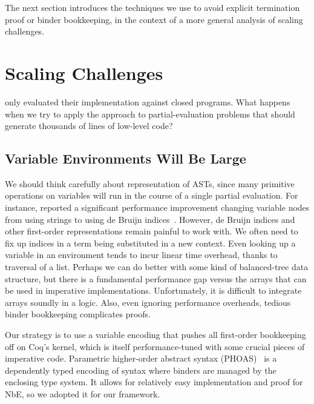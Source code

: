 The next section introduces the techniques we use to avoid explicit termination proof or binder bookkeeping, in the context of a more general analysis of scaling challenges.


\section{Scaling Challenges}\label{sec:scaling}

\textcite{Aehlig} only evaluated their implementation against closed programs.
What happens when we try to apply the approach to partial-evaluation problems that should generate thousands of lines of low-level code?

\subsection{Variable Environments Will Be Large}\label{sec:PHOAS}
We should think carefully about representation of ASTs, since many primitive operations on variables will run in the course of a single partial evaluation.
For instance, \textcite{Aehlig} reported a significant performance improvement changing variable nodes from using strings to using de Bruijn indices~\cite{debruijn1972}.
However, de Bruijn indices and other first-order representations remain painful to work with.
We often need to fix up indices in a term being substituted in a new context.
Even looking up a variable in an environment tends to incur linear time overhead, thanks to traversal of a list.
Perhaps we can do better with some kind of balanced-tree data structure, but there is a fundamental performance gap versus the arrays that can be used in imperative implementations.
Unfortunately, it is difficult to integrate arrays soundly in a logic.
Also, even ignoring performance overheads, tedious binder bookkeeping complicates proofs.

Our strategy is to use a variable encoding that pushes all first-order bookkeeping off on Coq's kernel, which is itself performance-tuned with some crucial pieces of imperative code.
Parametric higher-order abstract syntax (PHOAS)~\cite{PhoasICFP08} is a dependently typed encoding of syntax where binders are managed by the enclosing type system.
It allows for relatively easy implementation and proof for NbE, so we adopted it for our framework.

